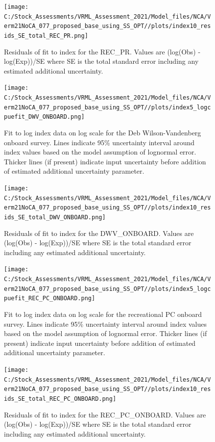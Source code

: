 \documentclass[
  english,
  a4paper,
]{article}
\begin{document}
\begin{figure}
\centering
\texttt{[image: C:/Stock\_Assessments/VRML\_Assessment\_2021/Model\_files/NCA/Verm21NoCA\_077\_proposed\_base\_using\_SS\_OPT//plots/index10\_resids\_SE\_total\_REC\_PR.png]}
\caption{Residuals of fit to index for the REC\_PR. Values are (log(Obs) - log(Exp))/SE where SE is the total standard error including any estimated additional uncertainty.\label{fig:cpue-resid-REC-PR}}
\end{figure}

\begin{figure}
\centering
\texttt{[image: C:/Stock\_Assessments/VRML\_Assessment\_2021/Model\_files/NCA/Verm21NoCA\_077\_proposed\_base\_using\_SS\_OPT//plots/index5\_logcpuefit\_DWV\_ONBOARD.png]}
\caption{Fit to log index data on log scale for the Deb Wilson-Vandenberg onboard survey. Lines indicate 95\% uncertainty interval around index values based on the model assumption of lognormal error. Thicker lines (if present) indicate input uncertainty before addition of estimated additional uncertainty parameter.\label{fig:log-cpue-DWV-ONBOARD}}
\end{figure}

\begin{figure}
\centering
\texttt{[image: C:/Stock\_Assessments/VRML\_Assessment\_2021/Model\_files/NCA/Verm21NoCA\_077\_proposed\_base\_using\_SS\_OPT//plots/index10\_resids\_SE\_total\_DWV\_ONBOARD.png]}
\caption{Residuals of fit to index for the DWV\_ONBOARD. Values are (log(Obs) - log(Exp))/SE where SE is the total standard error including any estimated additional uncertainty.\label{fig:cpue-resid-DWV-ONBOARD}}
\end{figure}

\begin{figure}
\centering
\texttt{[image: C:/Stock\_Assessments/VRML\_Assessment\_2021/Model\_files/NCA/Verm21NoCA\_077\_proposed\_base\_using\_SS\_OPT//plots/index5\_logcpuefit\_REC\_PC\_ONBOARD.png]}
\caption{Fit to log index data on log scale for the recreational PC onboard survey. Lines indicate 95\% uncertainty interval around index values based on the model assumption of lognormal error. Thicker lines (if present) indicate input uncertainty before addition of estimated additional uncertainty parameter.\label{fig:log-cpue-REC-PC-ONBOARD}}
\end{figure}

\begin{figure}
\centering
\texttt{[image: C:/Stock\_Assessments/VRML\_Assessment\_2021/Model\_files/NCA/Verm21NoCA\_077\_proposed\_base\_using\_SS\_OPT//plots/index10\_resids\_SE\_total\_REC\_PC\_ONBOARD.png]}
\caption{Residuals of fit to index for the REC\_PC\_ONBOARD. Values are (log(Obs) - log(Exp))/SE where SE is the total standard error including any estimated additional uncertainty.\label{fig:cpue-resid-REC-PC-ONBOARD}}
\end{figure}
\end{document}
